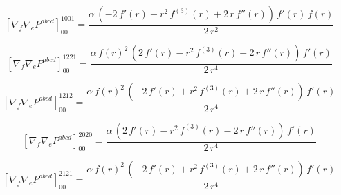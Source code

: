 \documentclass[11pt]{article}
\begin{document}
\par\smallskip
\begin{dmath*}[breakdepth={5}]
\left[\nabla_f\nabla_e P^{abcd}\right]_{00}^{1001} = \frac{\alpha\,\left(-2\,f'\!\left(r\right) + {r}^{2}\,f^{(3)}\!\left(r\right) + 2\,r\,f''\!\left(r\right)\right)\,f'\!\left(r\right)\,f\!\left(r\right)}{2\,{r}^{2}}
\end{dmath*}
\par\smallskip
\begin{dmath*}[breakdepth={5}]
\left[\nabla_f\nabla_e P^{abcd}\right]_{00}^{1221} = \frac{\alpha\,{f\!\left(r\right)}^{2}\,\left(2\,f'\!\left(r\right) - {r}^{2}\,f^{(3)}\!\left(r\right) - 2\,r\,f''\!\left(r\right)\right)\,f'\!\left(r\right)}{2\,{r}^{4}}
\end{dmath*}
\par\smallskip
\begin{dmath*}[breakdepth={5}]
\left[\nabla_f\nabla_e P^{abcd}\right]_{00}^{1212} = \frac{\alpha\,{f\!\left(r\right)}^{2}\,\left(-2\,f'\!\left(r\right) + {r}^{2}\,f^{(3)}\!\left(r\right) + 2\,r\,f''\!\left(r\right)\right)\,f'\!\left(r\right)}{2\,{r}^{4}}
\end{dmath*}
\par\smallskip
\begin{dmath*}[breakdepth={5}]
\left[\nabla_f\nabla_e P^{abcd}\right]_{00}^{2020} = \frac{\alpha\,\left(2\,f'\!\left(r\right) - {r}^{2}\,f^{(3)}\!\left(r\right) - 2\,r\,f''\!\left(r\right)\right)\,f'\!\left(r\right)}{2\,{r}^{4}}
\end{dmath*}
\par\smallskip
\begin{dmath*}[breakdepth={5}]
\left[\nabla_f\nabla_e P^{abcd}\right]_{00}^{2121} = \frac{\alpha\,{f\!\left(r\right)}^{2}\,\left(-2\,f'\!\left(r\right) + {r}^{2}\,f^{(3)}\!\left(r\right) + 2\,r\,f''\!\left(r\right)\right)\,f'\!\left(r\right)}{2\,{r}^{4}}
\end{dmath*}
\end{document}
